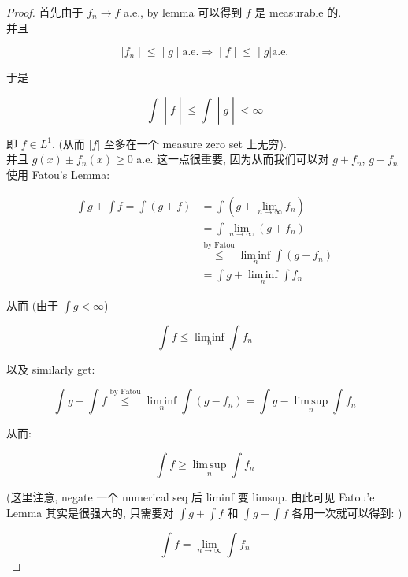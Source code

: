 \documentclass{qlnotes-export}
\begin{document}
\begin{proof}

首先由于 \(f_{n}\rightarrow f\) a.e., by lemma 可以得到 \(f\) 是 measurable 的.\\
并且

\[\left. |f_{n} \middle| \leq \middle| g \middle| \text{a.e.}\Longrightarrow \middle| f \middle| \leq \middle| g \right|\text{a.e.}\]

于是

\[\left. \int \middle| f \middle| \leq \int \middle| g \middle| < \infty \right.\]

即 \(f \in L^{1}\). (从而 \(|f|\) 至多在一个 measure zero set 上无穷).\\
并且 \(g(x) \pm f_{n}(x) \geq 0\) a.e. 这一点很重要, 因为从而我们可以对 \(g + f_{n}\), \(g - f_{n}\) 使用 Fatou's Lemma:

\[\begin{matrix}
{\int g + \int f = \int(g + f)} & {= \int(g + \lim\limits_{n\rightarrow\infty}f_{n})} \\
 & {= \int\lim\limits_{n\rightarrow\infty}(g + f_{n})} \\
 & {\overset{\text{by Fatou}}{\leq}\operatorname{lim\, inf}\limits_{n}\int(g + f_{n})} \\
 & {= \int g + \operatorname{lim\, inf}\limits_{n}\int f_{n}}
\end{matrix}\]

从而 (由于 \(\int g < \infty\))

\[\int f \leq \operatorname{lim\, inf}\limits_{n}\int f_{n}\]

以及 similarly get:

\[\int g - \int f\overset{\text{by Fatou}}{\leq}\operatorname{lim\, inf}\limits_{n}\int(g - f_{n}) = \int g - \operatorname{lim\, sup}\limits_{n}\int f_{n}\]

从而:

\[\int f \geq \operatorname{lim\, sup}\limits_{n}\int f_{n}\]

(这里注意, negate 一个 numerical seq 后 liminf 变 limsup. 由此可见 Fatou'e Lemma 其实是很强大的, 只需要对 \(\int g + \int f\) 和 \(\int g - \int f\) 各用一次就可以得到: )

\[\int f = \lim\limits_{n\rightarrow\infty}\int f_{n}\]

\end{proof}
\end{document}
